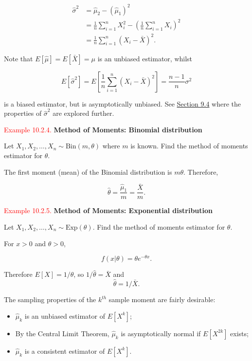 \documentclass[
]{book}
\providecommand{\tightlist}{%
  \setlength{\itemsep}{0pt}\setlength{\parskip}{0pt}}
\begin{document}
\begin{align*}
\hat{\sigma}^2 &= \hat{\mu}_2 - (\hat{\mu}_1)^2 \\ 
&= \frac{1}{n} \sum\limits_{i=1}^n X_i^2 - \left( \frac{1}{n} \sum\limits_{i=1}^n X_i \right)^2 \\
&= \frac{1}{n} \sum\limits_{i=1}^n (X_i - \bar{X})^2.
\end{align*}

\hfill\break
Note that \(E[\hat{\mu}] = E[\bar{X}] =\mu\) is an unbiased estimator, whilst

\[E[\hat{\sigma}^2] = E \left[\frac{1}{n} \sum\limits_{i=1}^n (X_i - \bar{X})^2 \right] = \frac{n-1}{n} \sigma^2\]

is a biased estimator, but is asymptotically unbiased. See \protect\hyperlink{paraestimate:variance}{Section 9.4} where the properties of \(\hat{\sigma}^2\) are explored further.

\leavevmode{}%
\textcolor{red}{Example 10.2.4.}
{\textbf{Method of Moments: Binomial distribution}}

Let \(X_1,X_2,\ldots,X_n \sim \text{Bin}(m,\theta)\) where \(m\) is known. Find the method of moments estimator for \(\theta\).

The first moment (mean) of the Binomial distribution is \(m \theta\). Therefore,

\[\hat{\theta} = \frac{\hat{\mu}_1}{m} = \frac{\bar{X}}{m}.\]

\hfill\break

\leavevmode{}%
\textcolor{red}{Example 10.2.5.}
{\textbf{Method of Moments: Exponential distribution}}

Let \(X_1,X_2,\ldots,X_n \sim \text{Exp}(\theta)\). Find the method of moments estimator for \(\theta\).

For \(x>0\) and \(\theta>0\),

\[f(x|\theta) = \theta e^{-\theta x}. \]

Therefore \(E[X] = 1/\theta\), so \(1/\hat{\theta} = \bar{X}\) and\\

\[\hat{\theta} = 1/\bar{X}.\]

The sampling properties of the \(k^{th}\) sample moment are fairly desirable:

\begin{itemize}
\tightlist
\item
  \(\hat{\mu}_k\) is an unbiased estimator of \(E[X^k]\);\\
\item
  By the Central Limit Theorem, \(\hat{\mu}_k\) is asymptotically normal if \(E[X^{2k}]\) exists;\\
\item
  \(\hat{\mu}_k\) is a consistent estimator of \(E[X^k]\).
\end{itemize}
\end{document}
